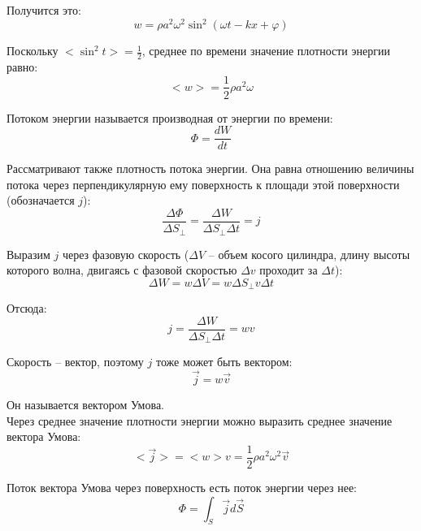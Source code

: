 \documentclass{article}
\begin{document}
	Получится это:
	\begin{equation}
		w = \rho a^2\omega^2\sin^2(\omega t - kx + \varphi)
	\end{equation}

	Поскольку $<\sin^2 t>=\frac{1}{2}$, среднее по времени значение плотности энергии равно:
	\begin{equation}
		<w> = \frac{1}{2}\rho a^2\omega
	\end{equation} 

	Потоком энергии называется производная от энергии по времени:
	\begin{equation}
		\Phi = \frac{dW}{dt}
	\end{equation}

	Рассматривают также плотность потока энергии. Она равна отношению величины потока через перпендикулярную ему поверхность к площади этой поверхности (обозначается $j$):
	\begin{equation}
		\frac{\Delta\Phi}{\Delta S_\perp} = \frac{\Delta W}{\Delta S_\perp\Delta t} = j
	\end{equation}

	Выразим $j$ через фазовую скорость ($\Delta V$ -- объем косого цилиндра, длину высоты которого волна, двигаясь с фазовой скоростью $\Delta v$ проходит за $\Delta t$):
	\begin{equation}
		\Delta W = w\Delta V = w\Delta S_\perp v\Delta t
	\end{equation}

	Отсюда:
	\begin{equation}
		j = \frac{\Delta W}{\Delta S_\perp\Delta t} = wv
	\end{equation}

	Скорость -- вектор, поэтому $j$ тоже может быть вектором:
	\begin{equation}
		\vec j = w\vec v
	\end{equation}

	Он называется вектором Умова.\\

	Через среднее значение плотности энергии можно выразить среднее значение вектора Умова:
	\begin{equation}
		<\vec j> = <w>v = \frac{1}{2}\rho a^2 \omega^2 \vec v
	\end{equation}

	Поток вектора Умова через поверхность есть поток энергии через нее:
	\begin{equation}
		\Phi = \int_S\vec j d\vec S
	\end{equation}
\end{document}
